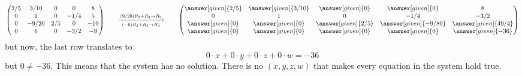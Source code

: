 \documentclass{ximera}
\begin{document}
\begin{example}[No solutions]
\begin{explanation}
\[
  \begin{pmatrix}
    {2/5}&  {3/10} & {0} &{0} &8 \\
    {0}&  {1} & {0} &{-1/4} & 5\\
    {0}&  {-9/20} & {2/5} &{0} &-10\\
    {0}&  {6} & {0} &{-3/2} &-9
  \end{pmatrix}
  \qquad\xrightarrow[(-6) R_2+R_4\to R_4]{(9/20) R_2 + R_3\to R_3}\qquad
  \begin{pmatrix}
    \answer[given]{2/5}&  \answer[given]{3/10} & \answer[given]{0} &\answer[given]{0} &8 \\
    {0}&  {1} & {0} &{-1/4} & -3/2\\
    \answer[given]{0}&  \answer[given]{0} & \answer[given]{2/5} &\answer[given]{-9/80} &\answer[given]{49/4}\\
    \answer[given]{0}&  \answer[given]{0} & \answer[given]{0} &\answer[given]{0} &\answer[given]{-36}
  \end{pmatrix}
\]
but now, the last row translates to
\[
0\cdot x+0\cdot y+0\cdot z+0\cdot w=-36
\]
but $0\ne -36$. This means that the system has no solution. There is
no $(x,y,z,w)$ that makes every equation in the system hold true.
\end{explanation}
\end{example}
\end{document}
